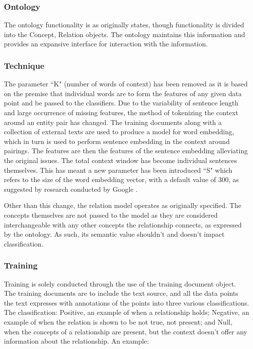 \documentclass[12pt]{article} %
\begin{document}
\subsubsection{Ontology}

The ontology functionality is as originally states, though functionality is divided into the Concept, Relation objects. The ontology maintains this information and provides an expansive interface for interaction with the information.

\subsubsection{Technique}

The parameter ``K" (number of words of context) has been removed as it is based on the premise that individual words are to form the features of any given data point and be passed to the classifiers. Due to the variability of sentence length and large occurrence of missing features, the method of tokenizing the context around an entity pair has changed. The training documents along with a collection of external texts are used to produce a model for word embedding, which in turn is used to perform sentence embedding in the context around pairings. The features are then the features of the sentence embedding alleviating the original issues. The total context window has become individual sentences themselves. This has meant a new parameter has been introduced ``S" which refers to the size of the word embedding vector, with a default value of 300, as suggested by research conducted by Google \cite{tang2014learning}.

Other than this change, the relation model operates as originally specified. The concepts themselves are not passed to the model as they are considered interchangeable with any other concepts the relationship connects, as expressed by the ontology. As such, its semantic value shouldn’t and doesn’t impact classification.

\subsubsection{Training}

Training is solely conducted through the use of the training document object. The training documents are to include the text source, and all the data points the text expresses with annotations of the points into three various classifications. The classification: Positive, an example of when a relationship holds; Negative, an example of when the relation is shown to be not true, not present; and Null, when the concepts of a relationship are present, but the context doesn’t offer any information about the relationship. An example:
\end{document}
